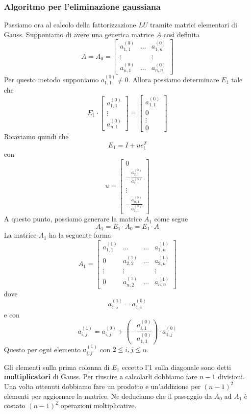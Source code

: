 \subsubsection{Algoritmo per l'eliminazione gaussiana}
Passiamo ora al calcolo della fattorizzazione $LU$ tramite matrici elementari di Gauss. Supponiamo di avere una
generica matrice $A$ così definita
\[
	A = A_0 = \begin{bmatrix}
		a_{1,1}^{(0)} & \dots & a_{1,n}^{(0)} \\
		\vdots        &       & \vdots        \\
		a_{n,1}^{(0)} & \dots & a_{n,n}^{(0)}
	\end{bmatrix}
\]
Per questo metodo supponiamo $a_{1,1}^{(0)} \neq 0$. Allora possiamo determinare $E_1$ tale che
\[
	E_1 \cdot \begin{bmatrix}
		a_{1,1}^{(0)} \\ \vdots \\ a_{n,1}^{(0)}
	\end{bmatrix} =
	\begin{bmatrix}
		a_{1,1}^{(0)} \\ 0 \\ \vdots \\ 0
	\end{bmatrix}
\]
Ricaviamo quindi che
\[ E_1 = I + u e_1^T \]
con
\[
	u = \begin{bmatrix}
		0 \\ -\frac{a_{2,1}^{(0)}}{a_{1,1}^{(0)}} \\ \vdots \\ -\frac{a_{n,1}^{(0)}}{a_{1,1}^{(0)}}
	\end{bmatrix}
\]
A questo punto, possiamo generare la matrice $A_1$ come segue
\[ A_1 = E_1 \cdot A_0 = E_1 \cdot A \]
La matrice $A_1$ ha la seguente forma
\[
	A_1 = \begin{bmatrix}
		a_{1,1}^{(1)} & \dots         & \dots & a_{1,n}^{(1)} \\
		0             & a_{2,2}^{(1)} & \dots & a_{2,n}^{(1)} \\
		\vdots        & \vdots        &       & \vdots        \\
		0             & a_{n,2}^{(1)} & \dots & a_{n,n}^{(1)}
	\end{bmatrix}
\]
dove
\[ a_{1,i}^{(1)} = a_{1,i}^{(0)} \]
e con
\[ a_{i,j}^{(1)} = a_{i,j}^{(0)} + \left( -\frac{a_{i,1}^{(0)}}{a_{1,1}^{(0)}} \right) \cdot a_{1,j}^{(0)} \]
Questo per ogni elemento $a_{i,j}^{(1)}$ con $2 \leq i,j \leq n$.

Gli elementi sulla prima colonna di $E_1$ eccetto l'1 sulla diagonale sono detti \textbf{moltiplicatori} di
Gauss. Per riuscire a calcolarli dobbiamo fare $n-1$ divisioni. Una volta ottenuti dobbiamo fare un prodotto
e un'addizione per $(n-1)^2$ elementi per aggiornare la matrice. Ne deduciamo che il passaggio da $A_0$ ad $A_1$
è costato $(n-1)^2$ operazioni moltiplicative.

